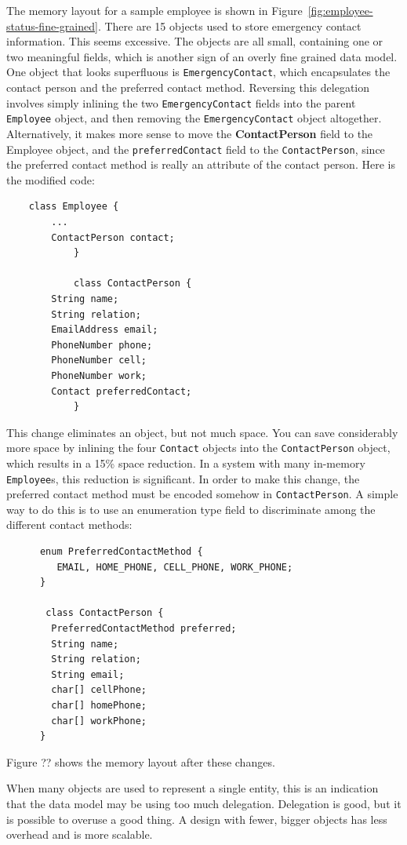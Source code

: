 \documentclass{book}
\theoremstyle{definition}
\begin{document}
The memory layout for a sample employee is shown in Figure~\ref{fig:employee-status-fine-grained}. There are 15 objects used to store emergency contact information. This seems excessive. The objects are all small, containing one or two meaningful fields, which is another sign of an overly fine grained data model. One object that looks superfluous is \texttt{EmergencyContact}, which encapsulates the contact person and the preferred contact method.  
Reversing this delegation involves simply inlining the two \texttt{EmergencyContact} fields into the parent \texttt{Employee} object, and then removing the \texttt{EmergencyContact} object altogether. Alternatively, it makes more sense to move the \textbf{ContactPerson} field to the Employee object, and the \texttt{preferredContact} field to the \texttt{ContactPerson}, since the preferred contact method is really an attribute of the contact person. Here is the modified code:
\ttfamily
\begin{verbatim}
	class Employee {
        ...
        ContactPerson contact;
			}
			
			class ContactPerson {
        String name;
        String relation;
        EmailAddress email;
        PhoneNumber phone;
        PhoneNumber cell;
        PhoneNumber work;
        Contact preferredContact;
			}
\end{verbatim}
\normalfont
This change eliminates an object, but not much space. You can save considerably more space by inlining the four \texttt{Contact} objects into the \texttt{ContactPerson} object, which results in a 15\%  space reduction. In a system with many in-memory \texttt{Employee}s, this reduction is significant. In order to make this change, the preferred contact method must be encoded somehow in \texttt{ContactPerson}.  A simple way to do this is to use an enumeration type field to discriminate among the different contact methods:
\ttfamily
\begin{verbatim} 
      enum PreferredContactMethod {
         EMAIL, HOME_PHONE, CELL_PHONE, WORK_PHONE;
      }
      
       class ContactPerson {
        PreferredContactMethod preferred;
        String name;
        String relation;
        String email;
        char[] cellPhone;
        char[] homePhone;
        char[] workPhone;
      }		
\end{verbatim}
\normalfont
Figure ?? shows the memory layout after these changes.

When many objects are used to represent a single entity, this is an indication that the data model may be using too much delegation. Delegation is good, but it is possible to overuse a good thing. A design with fewer, bigger objects has less overhead and is more scalable. 
\end{document}
